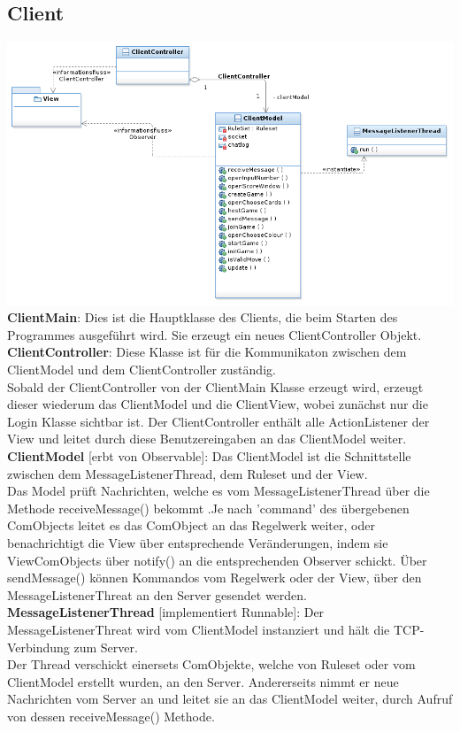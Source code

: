 \documentclass{article}
\begin{document}
\subsection{Client}
\includegraphics[width=\textwidth]{Client}
\textbf{ClientMain}: Dies ist die Hauptklasse des Clients, die beim Starten des Programmes ausgeführt wird. Sie erzeugt ein neues ClientController Objekt.\\

\textbf{ClientController}: Diese Klasse ist für die Kommunikaton zwischen dem ClientModel und dem ClientController zuständig.\\
Sobald der ClientController von der ClientMain Klasse erzeugt wird, erzeugt dieser wiederum das ClientModel und die ClientView, wobei zunächst nur die Login Klasse sichtbar ist. Der ClientController enthält alle ActionListener der View und leitet durch diese Benutzereingaben an das ClientModel weiter.\\

\textbf{ClientModel} [erbt von Observable]: Das ClientModel ist die Schnittstelle zwischen dem MessageListenerThread, dem Ruleset und der View.\\ 
Das Model prüft Nachrichten, welche es vom MessageListenerThread über die Methode receiveMessage() bekommt .Je nach 'command' des übergebenen ComObjects leitet es das ComObject an das Regelwerk weiter, oder benachrichtigt die View über entsprechende Veränderungen, indem sie ViewComObjects über notify()  an die entsprechenden Observer schickt. Über sendMessage() können Kommandos vom Regelwerk oder der View, über den MessageListenerThreat an den Server gesendet werden.\\

\textbf{MessageListenerThread} [implementiert Runnable]: Der MessageListenerThreat wird vom ClientModel instanziert und hält die TCP-Verbindung zum Server. \\
Der Thread verschickt einersets ComObjekte, welche von Ruleset oder vom ClientModel erstellt wurden, an den Server. Andererseits nimmt er neue Nachrichten vom Server an und leitet sie an das ClientModel weiter, durch Aufruf von dessen receiveMessage() Methode.\\
\end{document}
